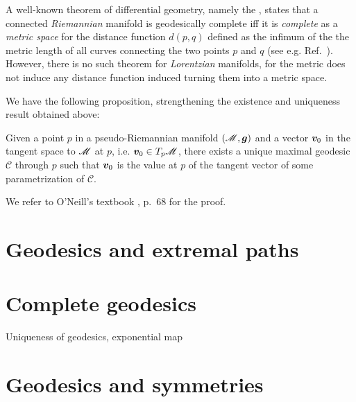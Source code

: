 \begin{remark}
A well-known theorem of differential geometry, namely the ,
states that a connected \emph{Riemannian} manifold is geodesically complete iff it is \emph{complete}
as a \emph{metric space} for the distance function $d(p,q)$ defined as the infimum of the
the metric length of all curves connecting the two points $p$ and $q$
(see e.g. Ref.~\cite{Lee97}). However, there is no such theorem for \emph{Lorentzian}
manifolds, for the metric does not induce any distance function induced turning them into a metric space.
\end{remark}


We have the following proposition, strengthening the existence and uniqueness
result obtained above:
\begin{greybox}
Given a point $p$ in a pseudo-Riemannian manifold $(\mathscr{M},\bm{g})$ and a vector
$\bm{v}_0$ in the tangent space to $\mathscr{M}$ at $p$, i.e. $\bm{v}_0 \in T_p\mathscr{M}$,
there exists a unique maximal geodesic $\mathcal{C}$ through $p$ such that
$\bm{v}_0$ is the value at $p$ of the tangent vector of some parametrization
of $\mathcal{C}$.
\end{greybox}
We refer to O'Neill's textbook \cite{ONeil83}, p.~68 for the proof.


\section{Geodesics and extremal paths}

\section{Complete geodesics}

Uniqueness of geodesics, exponential map

\section{Geodesics and symmetries}



